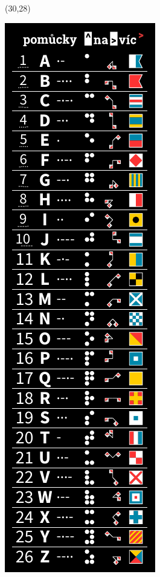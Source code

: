 \documentclass{extarticle}
\begin{document}
\pagestyle{empty}


\begin{textblock}{42}(30,28)
\vfill
{\centerline{\includegraphics[scale=1,]{front.pdf}}} 
\vfill
\end{textblock}
\end{document}
